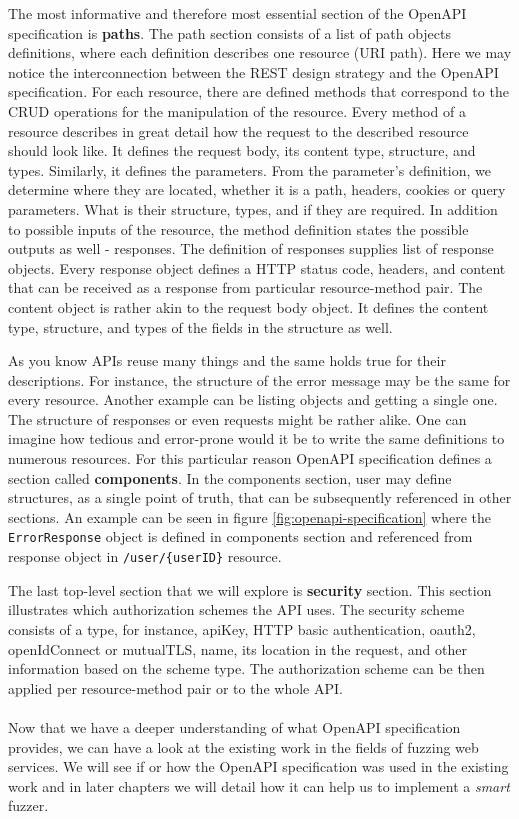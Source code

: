 The most informative and therefore most essential section of the OpenAPI specification is \textbf{paths}. The path section consists of a list of path objects definitions, where each definition describes one resource (URI path). Here we may notice the interconnection between the REST design strategy and the OpenAPI specification. For each resource, there are defined methods that correspond to the CRUD operations for the manipulation of the resource. Every method of a resource describes in great detail how the request to the described resource should look like. It defines the request body, its content type, structure, and types. Similarly, it defines the parameters. From the parameter's definition, we determine where they are located, whether it is a path, headers, cookies or query parameters. What is their structure, types, and if they are required. In addition to possible inputs of the resource, the method definition states the possible outputs as well - responses. The definition of responses supplies list of response objects. Every response object defines a HTTP status code, headers, and content that can be received as a response from particular resource-method pair. The content object is rather akin to the request body object. It defines the content type, structure, and types of the fields in the structure as well.

\label{subsec:components}
As you know APIs reuse many things and the same holds true for their descriptions. For instance, the structure of the error message may be the same for every resource. Another example can be listing objects and getting a single one. The structure of responses or even requests might be rather alike. One can imagine how tedious and error-prone would it be to write the same definitions to numerous resources. For this particular reason OpenAPI specification defines a section called \textbf{components}. In the components section, user may define structures, as a single point of truth, that can be subsequently referenced in other sections. An example can be seen in figure \ref{fig:openapi-specification} where the \texttt{ErrorResponse} object is defined in components section and referenced from response object in \texttt{/user/\{userID\}} resource.

The last top-level section that we will explore is \textbf{security} section. This section illustrates which authorization schemes the API uses. The security scheme consists of a type, for instance, apiKey, HTTP basic authentication, oauth2, openIdConnect or mutualTLS, name, its location in the request, and other information based on the scheme type. The authorization scheme can be then applied per resource-method pair or to the whole API.


\paragraph{}
Now that we have a deeper understanding of what OpenAPI specification provides, we can have a look at the existing work in the fields of fuzzing web services. We will see if or how the OpenAPI specification was used in the existing work and in later chapters we will detail how it can help us to implement a \emph{smart} fuzzer.
